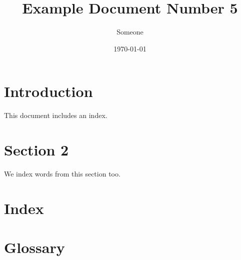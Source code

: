 \documentclass[11pt]{article}
\title{Example Document Number 5}
\author{Someone}
\date{\today}
\begin{document}
\maketitle
\section{Introduction}
This document includes an index.

\section{Section 2}
We index words from this section too.

\section{Index}
\printindex

\section{Glossary}
\end{document}
